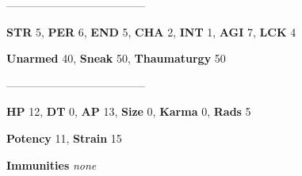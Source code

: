 \documentclass[11pt,a4paper,twocolumn]{book}
\begin{document}
%		
%	
%		

	--------------------------------------

	\noindent
	\textbf{STR} 5, \textbf{PER} 6, \textbf{END} 5, \textbf{CHA} 2, \textbf{INT} 1, \textbf{AGI} 7, \textbf{LCK} 4
	
	\noindent
	\textbf{Unarmed} 40, \textbf{Sneak} 50, \textbf{Thaumaturgy} 50
	
	--------------------------------------
	
	\noindent
	\textbf{HP} 12, \textbf{DT} 0, \textbf{AP} 13, \textbf{Size} 0, \textbf{Karma} 0, \textbf{Rads} 5
	
	\noindent
	\textbf{Potency} 11, \textbf{Strain} 15
	
	\noindent
	\textbf{Immunities} \emph{none}
	
\end{document}
